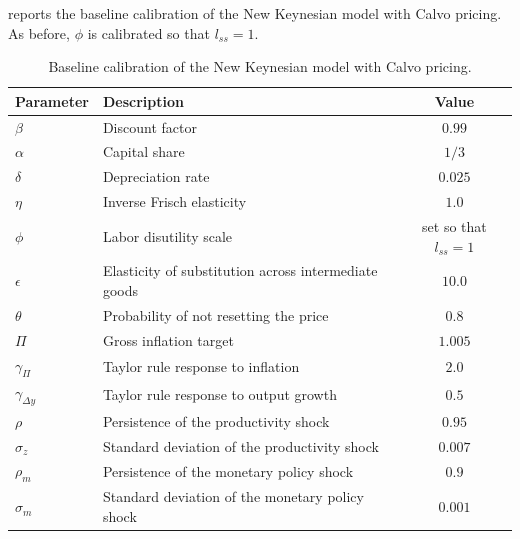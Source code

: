 \documentclass[12pt]{article}
\begin{document}
 reports the baseline calibration of the New Keynesian model with Calvo pricing. As before, $\phi$ is calibrated so that $l_{ss} = 1$.

\begin{table}[h!]
\centering
\begin{tabular}{llc}
\toprule
Parameter & Description & Value \\
\midrule
$\beta$ & Discount factor & $0.99$ \\
$\alpha$ & Capital share & $1/3$ \\
$\delta$ & Depreciation rate & $0.025$ \\
$\eta$ & Inverse Frisch elasticity & $1.0$ \\
$\phi$ & Labor disutility scale & set so that $l_{ss} = 1$ \\
$\epsilon$ & Elasticity of substitution across intermediate goods & $10.0$ \\
$\theta$ & Probability of not resetting the price & $0.8$ \\
$\Pi$ & Gross inflation target & $1.005$ \\
$\gamma_\Pi$ & Taylor rule response to inflation & $2.0$ \\
$\gamma_{\Delta y}$ & Taylor rule response to output growth & $0.5$ \\
$\rho$ & Persistence of the productivity shock & $0.95$ \\
$\sigma_z$ & Standard deviation of the productivity shock & $0.007$ \\
$\rho_m$ & Persistence of the monetary policy shock & $0.9$ \\
$\sigma_m$ & Standard deviation of the monetary policy shock & $0.001$ \\
\bottomrule
\end{tabular}
\caption{Baseline calibration of the New Keynesian model with Calvo pricing.}
\label{tab:calib-nk-calvo}
\end{table}

\newpage


\end{document}
